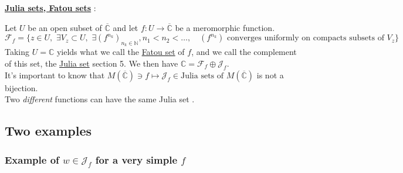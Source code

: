 \documentclass{article}
\newcommand\N{\mathbb{N}}
\newcommand\C{\mathbb{C}}
\def\prop#1{\underline{\textbf{#1}}}
\begin{document}
\prop{Julia sets, Fatou sets} : \\
\begin{changemargin}{1cm}{0cm}
Let $U$ be an open subset of $\overline{\C}$ and let $f : U \to \overline{\C}$ be a meromorphic function. \\
$$\mathcal{F}_f = \biggr\lbrace z \in U, \, \, \exists V_z \subset U, \, \, \exists (f^{n_k})_{n_k \in \N}, n_1 < n_2 < \dots, \quad (f^{n_k}) \text{ converges uniformly on compacts subsets of } V_z \biggr\rbrace$$
Taking $U = \C$ yields what we call the \underline{Fatou set} of $f$, and we call the complement of this set, the \underline{Julia set} \cite{Sut14} section 5. We then have $\C = \mathcal{F}_f \oplus \mathcal{J}_f$. \\
\vspace{2mm}
It's important to know that $M(\overline{\C}) \ni f \mapsto \mathcal{J}_f \in \text{Julia sets of }M(\overline{\C})$ is not a bijection. \\
Two \textit{different} functions can have the same Julia set \cite{Lev97}.
\end{changemargin}
\vspace{5mm}
\pagebreak

\subsection{Two examples}

\subsubsection{Example of $w \in \mathcal{J}_f$ for a very simple $f$}
\end{document}
